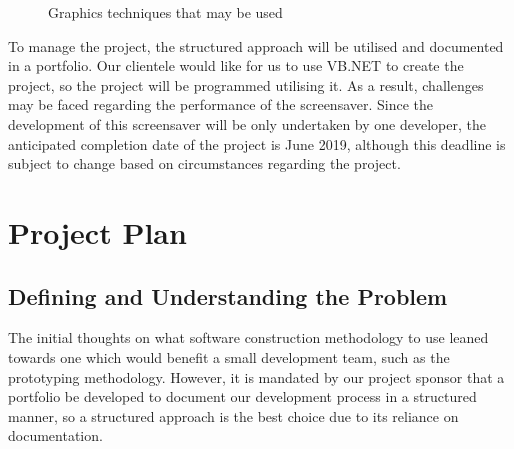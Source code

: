 \documentclass[10pt, openany]{book}
\begin{document}
\begin{figure}[H]
\caption{Graphics techniques that may be used}
\end{figure} 

To manage the project, the structured approach will be utilised and documented in a portfolio. Our clientele would like for us to use VB.NET to create the project, so the project will be programmed utilising it. As a result, challenges may be faced regarding the performance of the screensaver. Since the development of this screensaver will be only undertaken by one developer, the anticipated completion date of the project is June 2019, although this deadline is subject to change based on circumstances regarding the project.

\chapter{Project Plan}
\section{Defining and Understanding the Problem}
The initial thoughts on what software construction methodology to use leaned towards one which would benefit a small development team, such as the prototyping methodology. However, it is mandated by our project sponsor that a portfolio be developed to document our development process in a structured manner, so a structured approach is the best choice due to its reliance on documentation.
\end{document}
